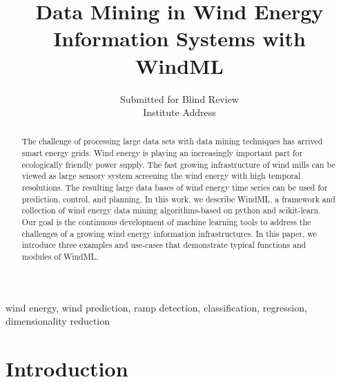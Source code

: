 \documentclass[10pt, conference, compsocconf]{IEEEtran}
\begin{document}
\title{Data Mining in Wind Energy Information Systems with WindML}



\author{Submitted for Blind Review\\Institute Address}


\maketitle


\begin{abstract}
The challenge of processing large data sets with data mining techniques has arrived smart energy grids. Wind energy is playing an increasingly important part for ecologically friendly power supply. The fast growing infrastructure of wind mills can be viewed as large sensory system screening the wind energy with high temporal resolutions. The resulting large data bases of wind energy time series can be used for prediction, control, and planning. In this work, we describe WindML, a framework and collection of wind energy data mining algorithms-based on python and scikit-learn. Our goal is the continuous development of machine learning tools to address the challenges of a growing wind energy information infrastructures. In this paper, we introduce three examples and use-cases that demonstrate typical functions and modules of WindML.
\end{abstract}

\begin{IEEEkeywords}
wind energy, wind prediction, ramp detection, classification, regression, dimensionality reduction

\end{IEEEkeywords}


\IEEEpeerreviewmaketitle



\section{Introduction}
\end{document}

